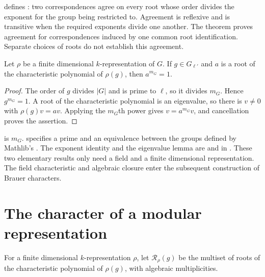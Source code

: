 \begin{implementation}
 defines
: two correspondences agree
on every root whose order divides the exponent for the group being restricted
to. Agreement is reflexive and is transitive when the required exponents
divide one another. The theorem 
proves agreement for correspondences induced by one common root
identification. Separate choices of roots do not establish this agreement.
\end{implementation}

\begin{lemma}
\label{lib:brauer:eigenvalues}
Let $\rho$ be a finite dimensional $k$-representation of $G$.
If $g\in G_{\ell'}$ and $a$ is a root of the characteristic polynomial of
$\rho(g)$, then $a^{m_G}=1$.
\end{lemma}
\begin{proof}
The order of $g$ divides $|G|$ and is prime to $\ell$, so it divides $m_G$.
Hence $g^{m_G}=1$. A root of the characteristic polynomial is an eigenvalue, so
there is $v\ne0$ with $\rho(g)v=av$. Applying the $m_G$th power gives
$v=a^{m_G}v$, and cancellation proves the assertion.
\end{proof}

\begin{implementation}
 is $m_G$.
 specifies a prime
 and an equivalence between the groups defined by Mathlib's
. The exponent identity and the
eigenvalue lemma are
 and
 in
.
These two elementary results only need a field and a finite dimensional
representation. The field characteristic and algebraic closure enter the
subsequent construction of Brauer characters.
\end{implementation}

\section{The character of a modular representation}
\label{lib:brauer:construction}

For a finite dimensional $k$-representation $\rho$, let
$\mathcal R_\rho(g)$ be the multiset of roots of the characteristic
polynomial of $\rho(g)$, with algebraic multiplicities.

